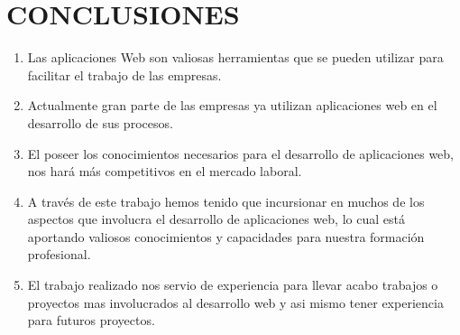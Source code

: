 \chapter*{CONCLUSIONES}
{
	\fontsize{12pt}{10mm}\selectfont
	\begin{enumerate}
		\item Las aplicaciones Web son valiosas herramientas que se pueden utilizar para facilitar el trabajo de las empresas.
		\vspace{6mm}
		
		\item Actualmente gran parte de las empresas ya utilizan aplicaciones web en el desarrollo de sus procesos.
		\vspace{6mm}
		
		\item El poseer los conocimientos necesarios para el desarrollo de aplicaciones web, nos hará más competitivos en el mercado laboral.
		\vspace{6mm}
		
		\item A través de este trabajo hemos tenido que incursionar en muchos de los aspectos que involucra el desarrollo de aplicaciones web, lo cual está aportando valiosos conocimientos y capacidades para nuestra formación profesional.
		\vspace{6mm}
		
		\item El trabajo realizado nos servio de experiencia para llevar acabo trabajos o proyectos mas involucrados al desarrollo web y asi mismo tener experiencia para futuros proyectos.   
  
		\vspace{6mm}
	\end{enumerate}
}
